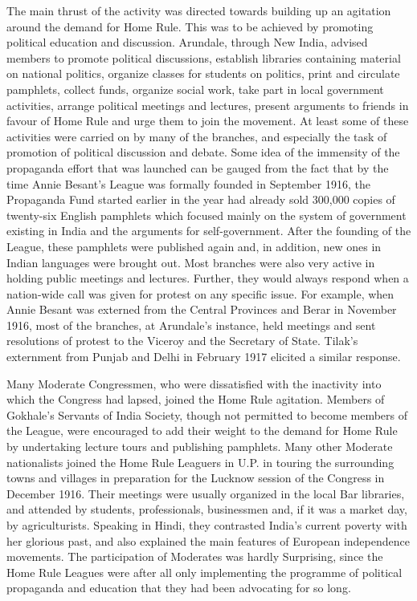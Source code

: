 \begin{multicols}{2}
The main thrust of the activity was directed towards building up an agitation around the demand for Home Rule. This was to be achieved by promoting political education and discussion. Arundale, through New India, advised members to promote political discussions, establish libraries containing material on national politics, organize classes for students on politics, print and circulate pamphlets, collect funds, organize social work, take part in local government activities, arrange political meetings and lectures, present arguments to friends in favour of Home Rule and urge them to join the movement. At least some of these activities were carried on by many of the branches, and especially the task of promotion of political discussion and debate. Some idea of the immensity of the propaganda effort that was launched can be gauged from the fact that by the time Annie Besant's League was formally founded in September 1916, the Propaganda Fund started earlier in the year had already sold 300,000 copies of twenty-six English pamphlets which focused mainly on the system of government existing in India and the arguments for self-government. After the founding of the League, these pamphlets were published again and, in addition, new ones in Indian languages were brought out. Most branches were also very active in holding public meetings and lectures. Further, they would always respond when a nation-wide call was given for protest on any specific issue. For example, when Annie Besant was externed from the Central Provinces and Berar in November 1916, most of the branches, at Arundale's instance, held meetings and sent resolutions of protest to the Viceroy and the Secretary of State. Tilak's externment from Punjab and Delhi in February 1917 elicited a similar response.

Many Moderate Congressmen, who were dissatisfied with the inactivity into which the Congress had lapsed, joined the Home Rule agitation. Members of Gokhale's Servants of India Society, though not permitted to become members of the League, were encouraged to add their weight to the demand for Home Rule by undertaking lecture tours and publishing pamphlets. Many other Moderate nationalists joined the Home Rule Leaguers in U.P. in touring the surrounding towns and villages in preparation for the Lucknow session of the Congress in December 1916. Their meetings were usually organized in the local Bar libraries, and attended by students, professionals, businessmen and, if it was a market day, by agriculturists. Speaking in Hindi, they contrasted India's current poverty with her glorious past, and also explained the main features of European independence movements. The participation of Moderates was hardly Surprising, since the Home Rule Leagues were after all only implementing the programme of political propaganda and education that they had been advocating for so long.


\end{multicols}
